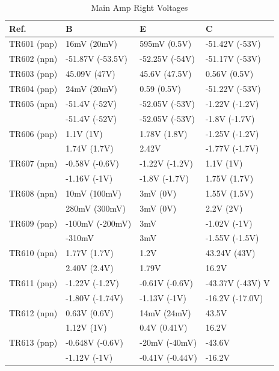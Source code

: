 \documentclass[]{article}
\begin{document}
\begin{table}[H]
	\centering
	\caption{Main Amp Right Voltages}
	\label{tab:main_amp_right_voltages}
	\begin{tabular}{|l|l|l|l|}
    \hline
 \textbf{Ref.} & \textbf{B} & \textbf{E} & \textbf{C} \\
    \hline
    TR601 (pnp) & 16mV (20mV)  & 595mV (0.5V)  & -51.42V  (-53V)  \\
    \hline
    TR602 (npn) & -51.87V (-53.5V)  & -52.25V (-54V)  & -51.17V (-53V) \\
    \hline
    TR603 (pnp) & 45.09V (47V) &  45.6V (47.5V) & 0.56V (0.5V)  \\
    \hline
    TR604 (pnp) & 24mV (20mV)  & 0.59 (0.5V) & -51.22V  (-53V) \\
    \hline
    TR605 (npn) & -51.4V (-52V) & -52.05V (-53V) & -1.22V (-1.2V)  \\
                & -51.4V (-52V) & -52.05V (-53V) & -1.8V (-1.7V)  \\
    \hline
    TR606 (pnp) & 1.1V (1V) & 1.78V (1.8V) & -1.25V (-1.2V) \\
                & 1.74V (1.7V) & 2.42V  & -1.77V (-1.7V) \\  
    \hline
    TR607 (npn) & -0.58V (-0.6V)  & -1.22V (-1.2V) & 1.1V (1V) \\
               & -1.16V (-1V)  & -1.8V (-1.7V) & 1.75V (1.7V) \\
    \hline
    TR608 (npn) & 10mV (100mV)  & 3mV (0V) & 1.55V (1.5V)  \\
                & 280mV (300mV)  & 3mV (0V)  & 2.2V (2V)  \\
    \hline
    TR609 (pnp) & -100mV (-200mV) & 3mV  & -1.02V (-1V)  \\
                & -310mV  & 3mV  & -1.55V (-1.5V) \\
    \hline
    TR610 (npn) & 1.77V (1.7V)  & 1.2V  & 43.24V (43V)  \\
                & 2.40V (2.4V) & 1.79V    & 16.2V   \\
    \hline
    TR611 (pnp) & -1.22V (-1.2V) & -0.61V (-0.6V)  & -43.37V (-43V) V  \\ 
                & -1.80V (-1.74V) & -1.13V (-1V)  & -16.2V (-17.0V) \\
    \hline
    TR612 (npn) & 0.63V (0.6V) & 14mV (24mV) & 43.5V \\
                & 1.12V (1V) & 0.4V (0.41V) & 16.2V \\
    \hline
    TR613 (pnp) & -0.648V (-0.6V) & -20mV (-40mV)  & -43.6V  \\
                & -1.12V (-1V) & -0.41V (-0.44V)  & -16.2V  \\
    \hline
	\end{tabular}
\end{table}
\end{document}
